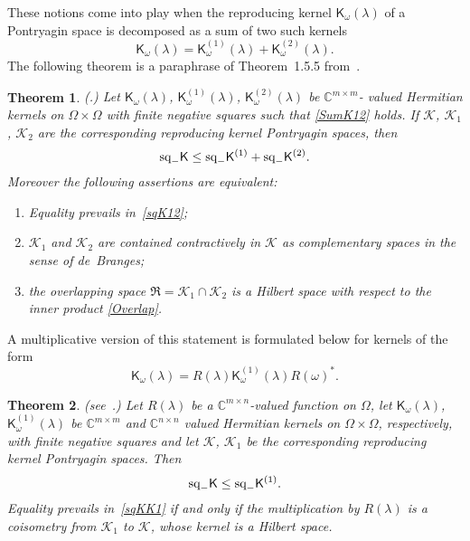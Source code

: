 \documentclass[12pt,twoside,a4paper]{amsart}
\newtheorem{thm}{Theorem}[section]
\theoremstyle{definition}
\numberwithin{equation}{section}
\begin{document}
These notions come into play when the reproducing kernel ${\mathsf
K}_\omega (\lambda)$ of a Pontryagin space is decomposed as a sum
of two such kernels
\begin{equation}\label{SumK12}
    {\mathsf K}_\omega(\lambda)={\mathsf K}_\omega^{(1)}(\lambda)+{\mathsf
    K}_\omega^{(2)}(\lambda).
\end{equation}
The following theorem is a paraphrase of Theorem~1.5.5 from~\cite{ADRS}.
\begin{thm}\label{SUMK12}{\rm(\cite[Theorem~1.5.5]{ADRS}.)}
Let ${\mathsf K}_\omega(\lambda)$, ${\mathsf
K}_\omega^{(1)}(\lambda)$, ${\mathsf K}_\omega^{(2)}(\lambda)$  be
${{\mathbb C}}^{m\times m}$- valued Hermitian kernels on $\Omega\times \Omega$
with finite negative squares such that \eqref{SumK12} holds. If
${{\mathcal K}}$, ${{\mathcal K}}_1$, ${{\mathcal K}}_2$ are the corresponding reproducing kernel
Pontryagin spaces, then
\begin{equation}\label{sqK12}
\textup{sq}_-{\mathsf K}\le\textup{sq}_-{\mathsf
K^{(1)}}+\textup{sq}_-{\mathsf K}^{(2)}.
\end{equation}
Moreover the following assertions are equivalent:
\begin{enumerate}
\item[\rm(1)]
Equality prevails in~\eqref{sqK12};\vskip 6pt
\item[\rm(2)]
 ${{\mathcal K}}_1$ and ${{\mathcal K}}_2$ are contained contractively in
${{\mathcal K}}$ as complementary spaces in the sense of de~Branges; \vskip 6pt
\item[\rm(3)]
the overlapping space ${{\mathfrak R}}={{\mathcal K}}_1\cap{{\mathcal K}}_2$ is a Hilbert space with
respect to the inner product \eqref{Overlap}.
\end{enumerate}
\end{thm}

A multiplicative version of this statement is formulated below for
kernels of the form
\begin{equation}\label{FactK}
    {\mathsf K}_\omega(\lambda)=R(\lambda){\mathsf
    K}_\omega^{(1)}(\lambda)R(\omega)^*.
\end{equation}
\begin{thm}\label{FACTK} {\rm(see~\cite[Theorem~1.5.7]{ADRS}.)}
Let $R(\lambda)$ be a ${{\mathbb C}}^{m\times n}$-valued function on $\Omega$,
let ${\mathsf K}_\omega(\lambda)$, ${\mathsf
K}_\omega^{(1)}(\lambda)$ be ${{\mathbb C}}^{m\times m}$ and ${{\mathbb C}}^{n\times n}$
valued Hermitian kernels on $\Omega\times \Omega$, respectively,
with finite negative squares and let ${{\mathcal K}}$, ${{\mathcal K}}_1$ be the
corresponding reproducing kernel Pontryagin spaces. Then
\begin{equation}\label{sqKK1}
\textup{sq}_-{\mathsf K}\le\textup{sq}_-{\mathsf K^{(1)}}.
\end{equation}
Equality prevails in~\eqref{sqKK1} if and only if the
multiplication by $R(\lambda)$ is a coisometry from ${{\mathcal K}}_1$ to
${{\mathcal K}}$, whose kernel is a Hilbert space.
\end{thm}
\end{document}
